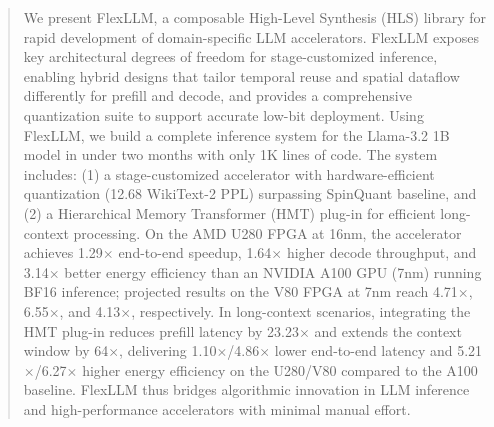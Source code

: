\documentclass[conference]{IEEEtran}
\begin{document}
\begin{abstract}
We present FlexLLM, a composable High-Level Synthesis (HLS) library for rapid development of domain-specific LLM accelerators. FlexLLM exposes key architectural degrees of freedom for stage-customized inference, enabling hybrid designs that tailor temporal reuse and spatial dataflow differently for prefill and decode, and provides a comprehensive quantization suite to support accurate low-bit deployment. Using FlexLLM, we build a complete inference system for the Llama-3.2 1B model in under two months with only 1K lines of code. The system includes: (1) a stage-customized accelerator with hardware-efficient quantization (12.68 WikiText-2 PPL) surpassing SpinQuant baseline, and (2) a Hierarchical Memory Transformer (HMT) plug-in for efficient long-context processing. On the AMD U280 FPGA at 16nm, the accelerator achieves 1.29$\times$ end-to-end speedup, 1.64$\times$ higher decode throughput, and 3.14$\times$ better energy efficiency than an NVIDIA A100 GPU (7nm) running BF16 inference; projected results on the V80 FPGA at 7nm reach 4.71$\times$, 6.55$\times$, and 4.13$\times$, respectively. In long-context scenarios, integrating the HMT plug-in reduces prefill latency by 23.23$\times$ and extends the context window by 64$\times$, delivering 1.10$\times$/4.86$\times$ lower end-to-end latency and 5.21$\times$/6.27$\times$ higher energy efficiency on the U280/V80 compared to the A100 baseline. FlexLLM thus bridges algorithmic innovation in LLM inference and high-performance accelerators with minimal manual effort.

\end{abstract}





%
\IEEEpeerreviewmaketitle


\end{document}
